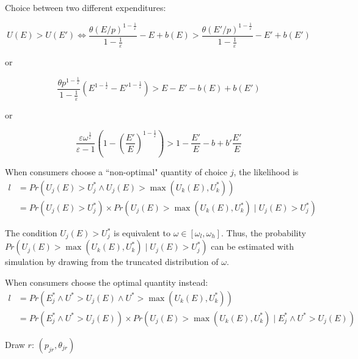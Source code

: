 \documentclass[10pt,a4paper]{article}
\begin{document}
Choice between two different expenditures:

\[U(E) > U(E') \Leftrightarrow \frac{\theta (E/p)^{1-\frac{1}{\varepsilon}}}{1-\frac{1}{\varepsilon}} - E + b(E)> \frac{\theta (E'/p)^{1-\frac{1}{\varepsilon}}}{1-\frac{1}{\varepsilon}} - E' + b(E')\]

or

\[\frac{\theta p^{1-\frac{1}{\varepsilon}}}{1-\frac{1}{\varepsilon}} \left(E^{1-\frac{1}{\varepsilon}} - {E'}^{1-\frac{1}{\varepsilon}}\right) > E-E' -b(E) + b(E')\]

or 

\[\frac{\varepsilon\omega^{\frac{1}{\varepsilon}}}{\varepsilon-1} \left(1 - \left(\frac{E'}{E}\right)^{1-\frac{1}{\varepsilon}}\right) > 1-\frac{E'}{E} - b + b'\frac{E'}{E}\]

When consumers choose a ``non-optimal" quantity of choice $j$, the likelihood is
\begin{align*}
l &= Pr\left(U_j(E) > U^*_j \land U_j(E) > \max(U_k(E), U_k^*)\right) \\
&= Pr(U_j(E) > U^*_j) \times Pr\left(U_j(E) > \max(U_k(E), U_k^*)\mid U_j(E) > U^*_j\right)
\end{align*}

The condition $U_j(E) > U^*_j$ is equivalent to $\omega \in [\omega_l, \omega_h]$. Thus, the probability $Pr\left(U_j(E) > \max(U_k(E), U_k^*)\mid U_j(E) > U^*_j\right)$ can be estimated with simulation by drawing from the truncated distribution of $\omega$.

When consumers choose the optimal quantity instead:
\begin{align*}
l &= Pr\left(E_j^* \land U^* > U_j(E) \land U^* > \max(U_k(E), U_k^*)\right) \\
&= Pr(E_j^* \land U^* > U_j(E)) \times  Pr\left(U_j(E) > \max(U_k(E), U_k^*) \mid E_j^* \land U^* > U_j(E) \right)
\end{align*}

Draw $r$: $(p_{jr}, \theta_{jr})$
\end{document}
